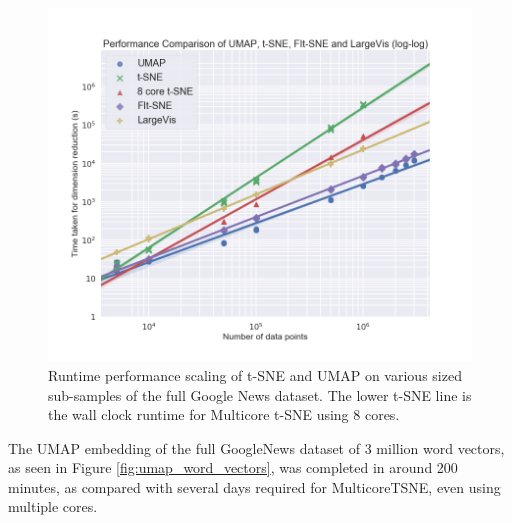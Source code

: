 \documentclass[12pt]{article}
\begin{document}
\begin{figure}[!hptb]
    \centering
    \includegraphics[width=\textwidth]{performance_comparison.png}
    \caption{Runtime performance scaling of t-SNE and UMAP on various sized sub-samples of the full Google News dataset. The lower t-SNE line is the wall clock runtime for Multicore t-SNE using 8 cores.}\label{fig:umap_tsne_scaling}
\end{figure}

The UMAP embedding of the full GoogleNews dataset of 3 million word vectors, as seen in Figure \ref{fig:umap_word_vectors}, was completed in around 200 minutes, as compared with several days required for MulticoreTSNE, even using multiple cores.
\end{document}
